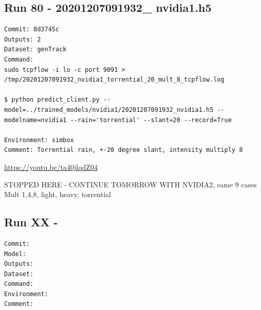 \subsection{Run 80 - 20201207091932\_ nvidia1.h5 }
\begin{verbatim}
Commit: 8d3745c 
Outputs: 2
Dataset: genTrack
Command:
sudo tcpflow -i lo -c port 9091 > /tmp/20201207091932_nvidia1_torrential_20_mult_8_tcpflow.log

$ python predict_client.py --model=../trained_models/nvidia1/20201207091932_nvidia1.h5 --modelname=nvidia1 --rain='torrential' --slant=20 --record=True

Environment: simbox
Comment: Torrential rain, +-20 degree slant, intensity multiply 8
\end{verbatim}
\url{https://youtu.be/ta40jlqdZ04}

STOPPED HERE - CONTINUE TOMORROW WITH NVIDIA2, same 9 cases Mult 1,4,8,
light, heavy, torrential

\subsection{Run XX -  }
\begin{verbatim}
Commit: 
Model: 
Outputs: 
Dataset: 
Command:
Environment:
Comment: 
\end{verbatim}









